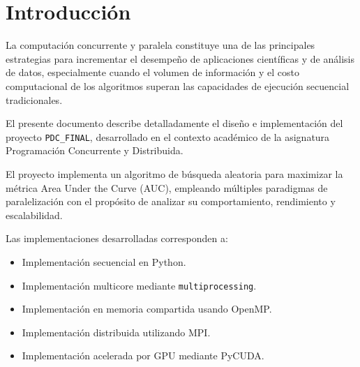 \chapter{Introducción}

La computación concurrente y paralela constituye una de las principales estrategias para incrementar el desempeño de aplicaciones científicas y de análisis de datos, especialmente cuando el volumen de información y el costo computacional de los algoritmos superan las capacidades de ejecución secuencial tradicionales.

El presente documento describe detalladamente el diseño e implementación del proyecto \texttt{PDC\_FINAL}, desarrollado en el contexto académico de la asignatura Programación Concurrente y Distribuida.

El proyecto implementa un algoritmo de búsqueda aleatoria para maximizar la métrica Area Under the Curve (AUC), empleando múltiples paradigmas de paralelización con el propósito de analizar su comportamiento, rendimiento y escalabilidad.

Las implementaciones desarrolladas corresponden a:

\begin{itemize}
    \item Implementación secuencial en Python.
    \item Implementación multicore mediante \texttt{multiprocessing}.
    \item Implementación en memoria compartida usando OpenMP.
    \item Implementación distribuida utilizando MPI.
    \item Implementación acelerada por GPU mediante PyCUDA.
\end{itemize}